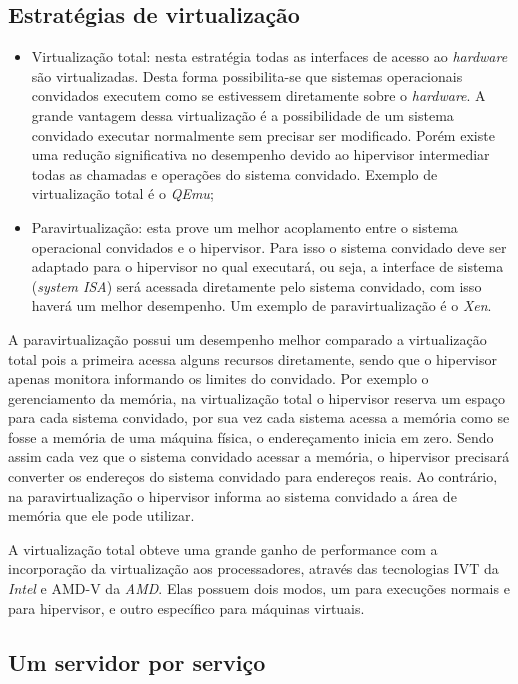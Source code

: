 \subsection{Estratégias de virtualização}
\label{section:virtestrat}

\begin{itemize}
 \item Virtualização total: nesta estratégia todas as interfaces de acesso ao \textit{hardware} são virtualizadas. Desta forma
 possibilita-se que sistemas operacionais convidados executem como se estivessem diretamente sobre o \textit{hardware}. A grande
 vantagem dessa virtualização é a possibilidade de um sistema convidado executar normalmente sem precisar ser modificado. Porém
 existe uma redução significativa no desempenho devido ao hipervisor intermediar todas as chamadas e operações do sistema convidado.
 Exemplo de virtualização total é o \textit{QEmu};
 \item Paravirtualização: esta prove um melhor acoplamento entre o sistema operacional convidados e o hipervisor. Para isso o sistema
 convidado deve ser adaptado para o hipervisor no qual executará, ou seja, a interface de sistema (\textit{system ISA}) será acessada
 diretamente pelo sistema convidado, com isso haverá um melhor desempenho. Um exemplo de paravirtualização é o \textit{Xen}.
\end{itemize}

A paravirtualização possui um desempenho melhor comparado a virtualização total pois a primeira acessa alguns recursos diretamente, 
sendo que o hipervisor apenas monitora informando os limites do convidado. Por exemplo o gerenciamento da memória, na virtualização total
o hipervisor reserva um espaço para cada sistema convidado, por sua vez cada sistema acessa a memória como se fosse a memória de uma
máquina física, o endereçamento inicia em zero. Sendo assim cada vez que o sistema convidado acessar a memória, o hipervisor precisará
converter os endereços do sistema convidado para endereços reais. Ao contrário, na paravirtualização o hipervisor informa ao sistema 
convidado a área de memória que ele pode utilizar.

A virtualização total obteve uma grande ganho de performance com a incorporação da virtualização aos processadores, através das 
tecnologias \ac{IVT} da \textit{Intel} e \ac{AMD-V} da \textit{AMD}. Elas possuem dois modos, um para execuções normais e para hipervisor, 
e outro específico para máquinas virtuais. 

\subsection{Um servidor por serviço}
\label{section:virtserv}

